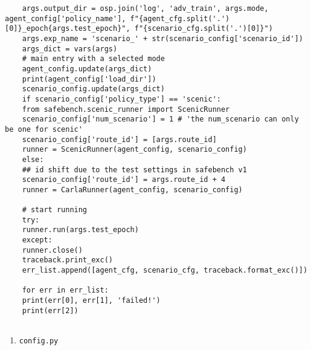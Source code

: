 \begin{enumerate}
\begin{verbatim}
	args.output_dir = osp.join('log', 'adv_train', args.mode, agent_config['policy_name'], f"{agent_cfg.split('.')[0]}_epoch{args.test_epoch}", f"{scenario_cfg.split('.')[0]}")
	args.exp_name = 'scenario_' + str(scenario_config['scenario_id'])
	args_dict = vars(args)
	# main entry with a selected mode
	agent_config.update(args_dict)
	print(agent_config['load_dir'])
	scenario_config.update(args_dict)
	if scenario_config['policy_type'] == 'scenic':
	from safebench.scenic_runner import ScenicRunner
	scenario_config['num_scenario'] = 1 # 'the num_scenario can only be one for scenic'
	scenario_config['route_id'] = [args.route_id]
	runner = ScenicRunner(agent_config, scenario_config)
	else:
	## id shift due to the test settings in safebench v1
	scenario_config['route_id'] = args.route_id + 4
	runner = CarlaRunner(agent_config, scenario_config)
	
	# start running
	try:
	runner.run(args.test_epoch)
	except:
	runner.close()
	traceback.print_exc()
	err_list.append([agent_cfg, scenario_cfg, traceback.format_exc()])
	
	for err in err_list:
	print(err[0], err[1], 'failed!')
	print(err[2])
	
\end{verbatim}
\end{enumerate}

\begin{enumerate}
	\item \texttt{config.py}
	\begin{verbatim}
		
	\end{verbatim}
\end{enumerate}

